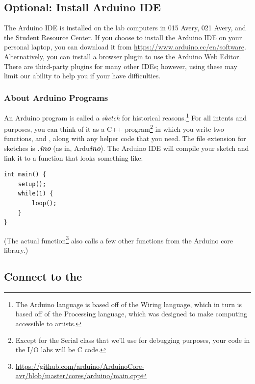 
\subsection{Optional: Install Arduino IDE}

The Arduino IDE is installed on the lab computers in 015 Avery, 021 Avery, and
the Student Resource Center. If you choose to install the Arduino IDE on your
personal laptop, you can download it from
\url{https://www.arduino.cc/en/software}. Alternatively, you can install a
browser plugin to use the
\href{https://create.arduino.cc/projecthub/Arduino_Genuino/getting-started-with-arduino-web-editor-on-various-platforms-4b3e4a}{Arduino
Web Editor}. There are third-party plugins for many other IDEs; however, using
these may limit our ability to help you if your have difficulties.

\subsubsection*{About Arduino Programs}

An Arduino program is called a \textit{sketch} for historical
reasons.\footnote{The Arduino language is based off of the Wiring language,
which in turn is based off of the Processing language, which was designed to
make computing accessible to artists.} For all intents and purposes, you can
think of it as a C++ program\footnote{Except for the Serial class that we'll
use for debugging purposes, your code in the I/O labs will be C code.} in which
you write two functions,  and , along with
any helper code that you need. The file extension for sketches is
\textbf{\textit{.ino}} (as in, Ardu\textbf{\textit{ino}}). The Arduino IDE will
compile your sketch and link it to a  function that looks
something like:
\begin{lstlisting}
int main() {
    setup();
    while(1) {
        loop();
    }
}
\end{lstlisting}
(The actual  function\footnote{\url{https://github.com/arduino/ArduinoCore-avr/blob/master/cores/arduino/main.cpp}}
also calls a few other functions from the Arduino core library.)

\subsection{Connect to the \nano}

